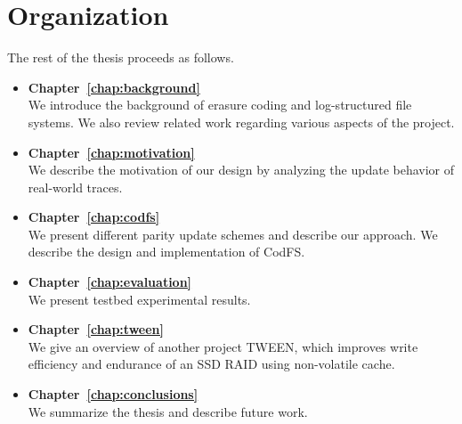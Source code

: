 
\section{Organization}

The rest of the thesis proceeds as follows. 

\begin{itemize}
    \item 
        \textbf{Chapter~\ref{chap:background}}\\
        We introduce the background of erasure coding and log-structured file
        systems. We also review related work regarding various aspects of the project.
    \item
        \textbf{Chapter~\ref{chap:motivation}}\\
        We describe the motivation of our design by analyzing the update
        behavior of real-world traces. 
    \item 
        \textbf{Chapter~\ref{chap:codfs}}\\
        We present different parity update schemes and describe our approach. We
        describe the design and implementation of CodFS. 
    \item 
        \textbf{Chapter~\ref{chap:evaluation}}\\ 
        We present testbed experimental results. 
    \item 
        \textbf{Chapter~\ref{chap:tween}}\\
        We give an overview of another project TWEEN, which improves write
        efficiency and endurance of an SSD RAID using non-volatile cache.
    \item 
        \textbf{Chapter~\ref{chap:conclusions}}\\
        We summarize the thesis and describe future work.
\end{itemize}

